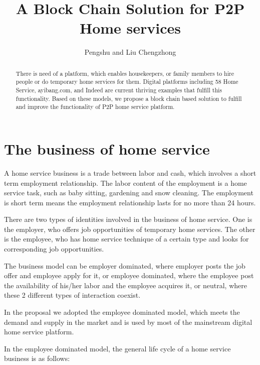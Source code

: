 \documentclass[]{scrartcl}
\title{A Block Chain Solution for P2P Home services}
\author{Pengshu and Liu Chengzhong}
\begin{document}
\maketitle

\begin{abstract}
There is need of a platform, which enables housekeepers, or family members to hire people or do temporary home services for them. Digital platforms including 58 Home Service, ayibang.com, and Indeed are current thriving examples that fulfill this functionality. Based on  these models, we propose a block chain based solution to fulfill and improve the functionality of P2P home service platform.
\end{abstract}

\section{The business of home service}


A home service business is a trade between labor and cash, which involves a short term employment relationship. The labor content of the employment is a home service task, such as baby sitting, gardening and snow cleaning. The employment is short term means the employment relationship lasts for no more than 24 hours.

There are two types of identities involved in the business of home service. One is the employer, who offers job opportunities of  temporary home services. The other is the employee, who has home service technique of a certain type and looks for corresponding job opportunities.

The business model can be employer dominated, where employer posts the job offer and employee apply for it, or employee dominated, where the employee post the availability of his/her labor and the employee acquires it, or neutral, where these 2 different types of interaction coexist.

In the proposal we adopted the employee dominated model, which meets the demand and supply in the market and is used by most of the mainstream digital home service platform.

In the employee dominated model, the general life cycle of a home service business is as follows:
\end{document}
